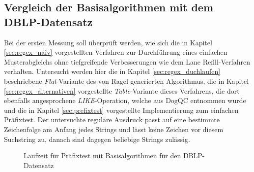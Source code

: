 \subsection{Vergleich der Basisalgorithmen mit dem DBLP-Datensatz}
\label{sec:regex_evaluation_beobachtung_1}

Bei der ersten Messung soll überprüft werden, wie sich die in Kapitel \ref{sec:regex_naiv} vorgestellten Verfahren zur Durchführung eines einfachen Musterabgleichs ohne tiefgreifende Verbesserungen wie dem Lane Refill-Verfahren verhalten.
Untersucht werden hier die in Kapitel \ref{sec:regex_duchlaufen} beschriebene \emph{Flat}-Variante des von Ragel generierten Algorithmus, die in Kapitel \ref{sec:regex_alternativen} vorgestellte \emph{Table}-Variante dieses Verfahrens, die dort ebenfalls angesprochene \emph{LIKE}-Operation, welche aus DogQC entnommen wurde und die in Kapitel \ref{sec:prefixtest} vorgestellte Implementierung zum einfachen Präfixtest.
Der untersuchte reguläre Ausdruck passt auf eine bestimmte Zeichenfolge am Anfang jedes Strings und lässt keine Zeichen vor diesem Suchstring zu, danach sind dagegen beliebige Strings zulässig. 

\begin{figure}[ht]
	\centering
	\caption{Laufzeit für Präfixtest mit Basisalgorithmen für den DBLP-Datensatz}
	\label{fig:regex_dblpANY_no_buffer}
\end{figure}


